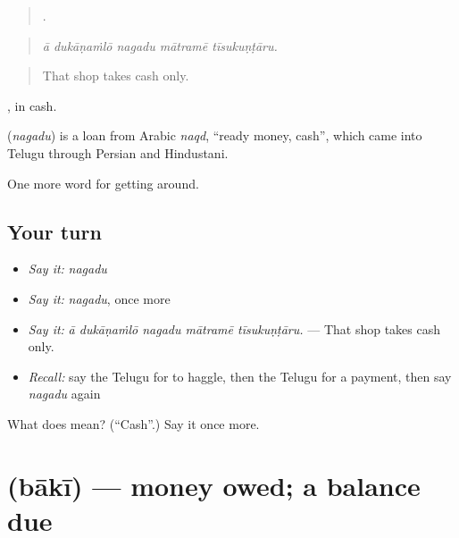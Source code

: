 \begin{quote}
    .
\end{quote}

\begin{quote}
\emph{ā dukāṇaṁlō nagadu mātramē tīsukuṇṭāru.}
\end{quote}

\begin{quote}
That shop takes cash only.
\end{quote}

 , in cash.

\begin{cousinweb}
\textbf{} (\emph{nagadu}) is a loan from Arabic \emph{naqd}, \textquotedblleft{}ready money, cash\textquotedblright{}, which came into Telugu through Persian and Hindustani.
\end{cousinweb}

\begin{grammarlens}[title={What you've built}]
One more word for getting around.
\end{grammarlens}

\subsection*{Your turn}
\begin{itemize}
\raggedright
  \item \emph{Say it:} \emph{nagadu}
  \item \emph{Say it:} \emph{nagadu}, once more
  \item \emph{Say it:} \emph{ā dukāṇaṁlō nagadu mātramē tīsukuṇṭāru.} — That shop takes cash only.
  \item \emph{Recall:} say the Telugu for to haggle, then the Telugu for a payment, then say \emph{nagadu} again
\end{itemize}

\begin{tcolorbox}[breakable,colback=teal!4,colframe=teal!35!black,title={Before you move on}]
What does  mean? (\textquotedblleft{}Cash\textquotedblright{}.) Say it once more.
\end{tcolorbox}
\section[\texorpdfstring{\te{బాకీ} (bākī)}{బాకీ (bākī)}]{ (bākī) — money owed; a balance due}

\label{lesson:TE-C485-baki}



